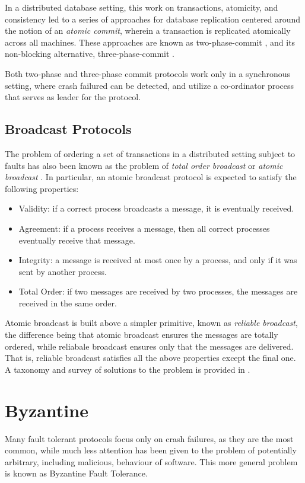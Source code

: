 In a distributed database setting, this work on transactions, atomicity, and consistency
led to a series of approaches for database replication centered around the notion of an \emph{atomic commit},
wherein a transaction is replicated atomically across all machines.
These approaches are known as two-phase-commit \cite{gray1978notes}, and its non-blocking alternative,
three-phase-commit \cite{skeen1983formal}.

Both two-phase and three-phase commit protocols work only in a synchronous setting,
where crash failured can be detected, and utilize a co-ordinator process that serves as leader for the protocol.

\subsection{Broadcast Protocols}

The problem of ordering a set of transactions in a distributed setting subject to faults has also been known as 
the problem of \emph{total order broadcast} or \emph{atomic broadcast} \cite{defago2004total}.
In particular, an atomic broadcast protocol is expected to satisfy the following properties:

\begin{itemize}
\item{Validity}: if a correct process broadcasts a message, it is eventually received.
\item{Agreement}: if a process receives a message, then all correct processes eventually receive that message.
\item{Integrity}: a message is received at most once by a process, and only if it was sent by another process.
\item{Total Order}: if two messages are received by two processes, the messages are received in the same order.
\end{itemize}

Atomic broadcast is built above a simpler primitive, known as \emph{reliable broadcast}, 
the difference being that atomic broadcast ensures the messages are totally ordered,
while reliabale broadcast ensures only that the messages are delivered.
That is, reliable broadcast satisfies all the above properties except the final one.
A taxonomy and survey of solutions to the problem is provided in \cite{defago2004total}.

\section{Byzantine}
Many fault tolerant protocols focus only on crash failures, as they are the most common,
while much less attention has been given to the problem of potentially arbitrary, including malicious,
behaviour of software. This more general problem is known as Byzantine Fault Tolerance.

